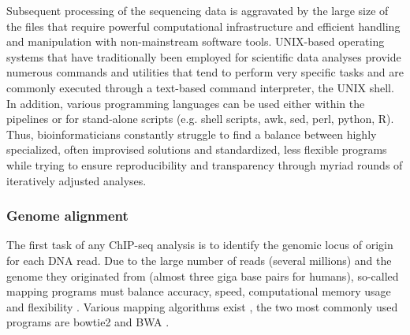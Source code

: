 Subsequent processing of the sequencing data is aggravated by the large size of the files that require powerful computational infrastructure and efficient handling and manipulation with non-mainstream software tools. UNIX-based operating systems that have traditionally been employed for scientific data analyses provide numerous commands and utilities that tend to perform very specific tasks and are commonly executed through a text-based command interpreter, the UNIX shell. In addition, various programming languages can be used either within the pipelines or for stand-alone scripts (e.g. shell scripts, awk, sed, perl, python, R). Thus, bioinformaticians constantly struggle to find a balance between highly specialized, often improvised solutions and standardized, less flexible programs while trying to ensure reproducibility and transparency through myriad rounds of iteratively adjusted analyses.
%
\subsubsection{Genome alignment}
The first task of any ChIP-seq analysis is to identify the genomic locus of origin for each DNA read. Due to the large number of reads (several millions) and the genome they originated from (almost three giga base pairs for humans), so-called mapping programs must balance accuracy, speed, computational memory usage and flexibility \citep{Leleu2010}. Various mapping algorithms exist \cite{Flicek2009}, the two most commonly used programs are bowtie2 \citep{Langmead2012} and BWA \cite{Li2010a}.

